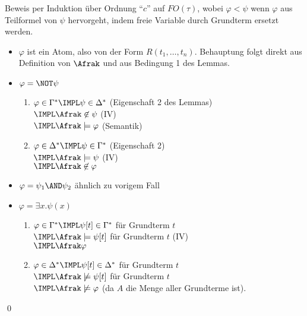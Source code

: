Beweis per Induktion über Ordnung \enquote{$c$} auf $FO(\tau)$, wobei
$\varphi<\psi$ wenn $\varphi$ aus Teilformel von $\psi$ hervorgeht, indem
freie Variable durch Grundterm ersetzt werden.

\begin{itemize}
  \item $\varphi$ ist ein Atom, also von der Form $R(t_1,\dots,t_n)$.
  Behauptung folgt direkt aus Definition von $\Afrak$ und aus Bedingung 1 des Lemmas.
  
  \item $\varphi = \NOT\psi$
  \begin{enumerate}
    \item $\varphi\in\Gamma^*\IMPL\psi\in\Delta^*$ (Eigenschaft 2 des Lemmas)\\
                            $\IMPL\Afrak\not\in\psi$ (IV)\\
                            $\IMPL\Afrak\models\varphi$ (Semantik)
    \item $\varphi\in\Delta^*\IMPL\psi\in\Gamma^*$ (Eigenschaft 2)\\
                            $\IMPL\Afrak\models\psi$ (IV)\\
                            $\IMPL\Afrak\not\in\varphi$
  \end{enumerate}

  \item $\varphi=\psi_1\AND\psi_2$      ähnlich zu vorigem Fall
  
  \item $\varphi=\exists x.\psi(x)$
  \begin{enumerate}
    \item $\varphi\in\Gamma^*\IMPL\psi[t]\in\Gamma^*$ für Grundterm $t$\\
                            $\IMPL\Afrak\models\psi[t]$ für Grundterm $t$ (IV)\\
                            $\IMPL\Afrak\varphi$
                          
    \item $\varphi\in\Delta^*\IMPL\psi[t]\in\Delta^*$ für Grundterm $t$\\
                            $\IMPL\Afrak\not\models\psi[t]$ für Grundterm $t$\\
                            $\IMPL\Afrak\not\models\varphi$ (da $A$ die Menge aller Grundterme ist).
  \end{enumerate}
\end{itemize}
\qed

